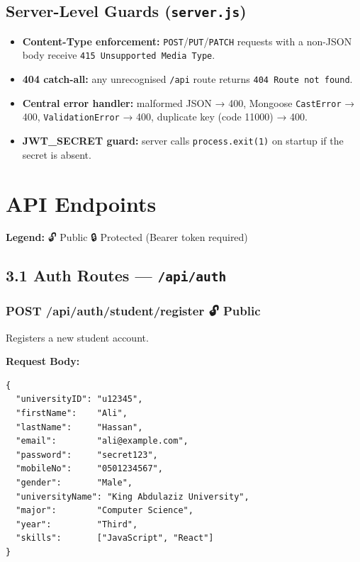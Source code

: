 \documentclass[12pt,a4paper]{article}
\begin{document}
\subsection*{Server-Level Guards (\texttt{server.js})}

\begin{itemize}[leftmargin=1.5cm]
  \item \textbf{Content-Type enforcement:} \texttt{POST}/\texttt{PUT}/\texttt{PATCH} requests with a non-JSON body receive \texttt{415 Unsupported Media Type}.
  \item \textbf{404 catch-all:} any unrecognised \texttt{/api} route returns \texttt{404 Route not found}.
  \item \textbf{Central error handler:} malformed JSON → 400, Mongoose \texttt{CastError} → 400, \texttt{ValidationError} → 400, duplicate key (code 11000) → 400.
  \item \textbf{JWT\_SECRET guard:} server calls \texttt{process.exit(1)} on startup if the secret is absent.
\end{itemize}

\newpage

\section{API Endpoints}

\noindent\textbf{Legend:} \quad 🔓 Public \quad 🔒 Protected (Bearer token required)

\vspace{0.5cm}

\subsection*{3.1 Auth Routes — \texttt{/api/auth}}

\subsubsection*{POST /api/auth/student/register \quad 🔓 Public}

Registers a new student account.

\textbf{Request Body:}
\begin{lstlisting}[language={}]
{
  "universityID": "u12345",
  "firstName":    "Ali",
  "lastName":     "Hassan",
  "email":        "ali@example.com",
  "password":     "secret123",
  "mobileNo":     "0501234567",
  "gender":       "Male",
  "universityName": "King Abdulaziz University",
  "major":        "Computer Science",
  "year":         "Third",
  "skills":       ["JavaScript", "React"]
}
\end{lstlisting}
\end{document}
